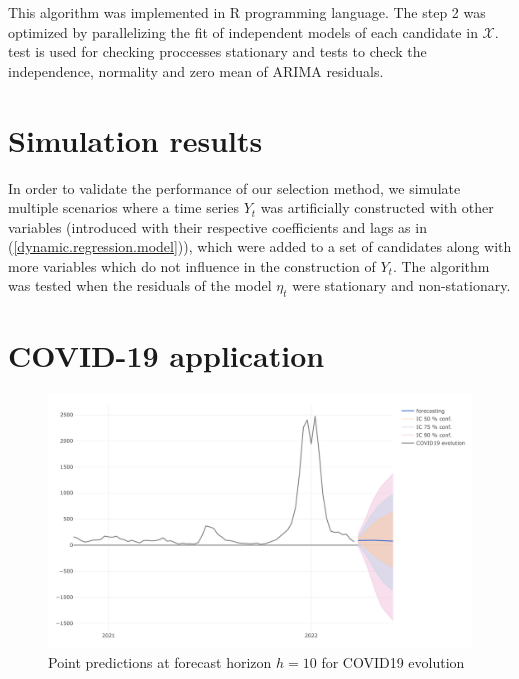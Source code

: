 \documentclass[a4paper]{easychair}
\begin{document}
This algorithm was implemented in R programming language. The step 2 was optimized by parallelizing the fit of independent models of each candidate in $\mathcal{X}$. \cite{dickey1979distribution} test is used for checking proccesses stationary and \cite{Haynes2013, shapiro1965analysis, Jarque2011, ljungbox1970, ljungbox1978} tests to check the independence, normality and zero mean of ARIMA residuals. 

\section{Simulation results}

In order to validate the performance of our selection method, we simulate multiple scenarios where a time series $Y_t$ was artificially constructed with other variables (introduced with their respective coefficients and lags as in (\ref{dynamic.regression.model})), which were added to a set of candidates along with more variables which do not influence in the construction of $Y_t$. The algorithm was tested when the residuals of the model $\eta_t$ were stationary and non-stationary. 

\section{COVID-19 application}


\begin{figure}
    \centering
    \label{covid19application}
    \caption{Point predictions at forecast horizon $h=10$ for COVID19 evolution}
    \includegraphics[scale=0.55]{preds_covid19_vac.pdf}
\end{figure}
\end{document}
